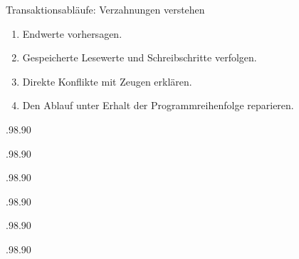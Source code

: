 \documentclass[aspectratio=169]{beamer}
\begin{document}
\begin{frame}{Transaktionsabläufe: Verzahnungen verstehen}
\begin{enumerate}
\item Endwerte vorhersagen.
\item Gespeicherte Lesewerte und Schreibschritte verfolgen.
\item Direkte Konflikte mit Zeugen erklären.
\item Den Ablauf unter Erhalt der Programmreihenfolge reparieren.
\end{enumerate}
\end{frame}
\begin{frame}
\begin{transactionsschedule}[id=counter]{.98\linewidth}{.90\textheight}
\end{transactionsschedule}
\end{frame}
\begin{frame}
\begin{transactionsschedule}[id=independent]{.98\linewidth}{.90\textheight}
\end{transactionsschedule}
\end{frame}
\begin{frame}
\begin{transactionsschedule}[id=read_read]{.98\linewidth}{.90\textheight}
\end{transactionsschedule}
\end{frame}
\begin{frame}
\begin{transactionsschedule}[id=write_write]{.98\linewidth}{.90\textheight}
\end{transactionsschedule}
\end{frame}
\begin{frame}
\begin{transactionsschedule}[id=chain]{.98\linewidth}{.90\textheight}
\end{transactionsschedule}
\end{frame}
\begin{frame}
\begin{transactionsschedule}[id=blind_write]{.98\linewidth}{.90\textheight}
\end{transactionsschedule}
\end{frame}
\end{document}
